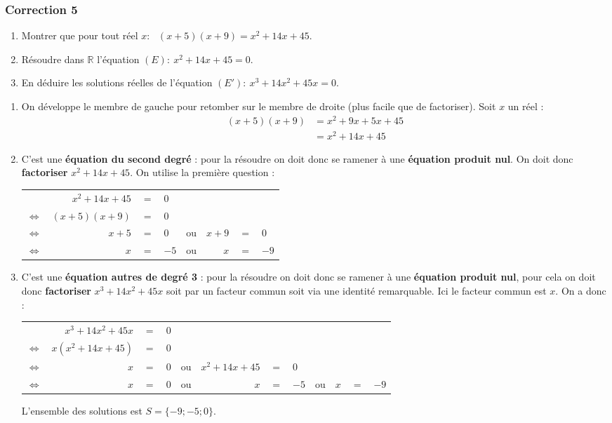 \documentclass[15pt, mathserif]{beamer}
\newcommand{\R}{\mathbb{R}}			%
\newcommand{\ligneq}[2]{$\Longleftrightarrow$ & $#1$ & $=$ & $#2$ \\}
\newcommand{\Ligneq}[2]{ & $#1$ & $=$ & $#2$ \\}
\newenvironment{RPN}{\begin{center}\begin{tabular}{rrclcrcl}}{\end{tabular}\end{center}}
\newcommand{\lignerpn}[4]{$\Longleftrightarrow$ & $#1$ & $=$ & $#2$ & ou & $#3$ & $=$ & $#4$ \\}
\newenvironment{TRPN}{\begin{center}\begin{tabular}{rrclcrclcrcl}}{\end{tabular}\end{center}}
\newcommand{\lignetrpn}[6]{$\Longleftrightarrow$ & $#1$ & $=$ & $#2$ & ou & $#3$ & $=$ & $#4$ & ou & $#5$ & $=$ & $#6$ \\}
\begin{document}
\begin{frame}
\vspace{-10mm}
	\frametitle{Correction 5}
\begin{enumerate} 
 	 \item Montrer que pour tout réel $x$:~ $(x+5)(x+9)=x^2+14x+45$. 
 	 \item Résoudre dans $\R$ l'équation $(E):~x^2+14x+45= 0$. 
 	 \item En déduire les solutions réelles de l'équation $(E'):~x^3+14x^2+45x = 0$. 
 \end{enumerate} 
 
 \bigskip 
 \bigskip 
 \begin{enumerate} 
 	 \item On développe le membre de gauche pour retomber sur le membre de droite (plus facile que de factoriser). Soit $x$ un réel : 
 	 	 \begin{align*} 
 	 	 (x+5)(x+9)&=x^2+9x+5x+45 \\ 
 	 	 	 &=x^2+14x+45 
 	 \end{align*} 
 \end{enumerate} 
 \end{frame} 
 \begin{frame} 
 \begin{enumerate} \setcounter{enumi}{1}  
 	 \item C'est une \textbf{équation du second degré} : pour la résoudre on doit donc se ramener à une \textbf{équation produit nul}. On doit donc \textbf{factoriser} $x^2+14x+45$. On utilise la première question : 
 	 	  \begin{RPN} 
 	 	  	 \Ligneq{x^2+14x+45}{0} 
 	 	 	 \ligneq{(x+5)(x+9)}{0} 
 	 	 	 \lignerpn{x+5}{0}{x+9}{0} 
 	 	 	 \lignerpn{x}{-5}{x}{-9} 
 	 	  \end{RPN} 
 	 \item C'est une \textbf{équation autres de degré 3} : pour la résoudre on doit donc se ramener à une \textbf{équation produit nul}, pour cela on doit donc \textbf{factoriser} $x^3+14x^2+45x $ soit par un facteur commun soit via une identité remarquable. Ici le facteur commun est $x$. On a donc : 
 	 	 \begin{footnotesize} 
 \begin{TRPN} 
 	 	 	 \Ligneq{x^3+14x^2+45x}{0} 
 	 	 	 \ligneq{x(x^2+14x+45)}{0} 
 	 	 	 \lignerpn{x}{0}{x^2+14x+45}{0} 
 	 	 	 \lignetrpn{x}{0}{x}{-5}{x}{-9} 
 	 	 \end{TRPN} 
 \end{footnotesize} L'ensemble des solutions est $S=\{-9;-5;0\}$. 
 \end{enumerate} 
 
 \end{frame}
\end{document}
